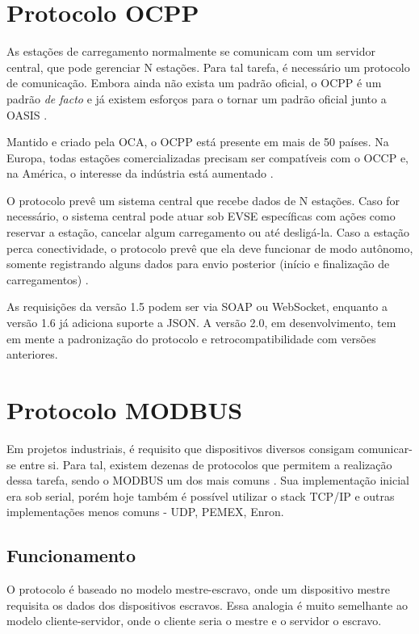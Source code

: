  \section{Protocolo OCPP}

    As estações de carregamento normalmente se comunicam com um servidor central, que pode gerenciar N estações. Para tal tarefa, é necessário um protocolo de comunicação. Embora ainda não exista um padrão oficial, o \ac{OCPP} é um padrão \textit{de facto} e já existem esforços para o tornar um padrão oficial junto a \ac{OASIS} \cite{ocpp-news-standardization}.

    Mantido e criado pela \ac{OCA}, o OCPP está presente em mais de 50 países. Na Europa, todas estações comercializadas precisam ser compatíveis com o OCCP e, na América, o interesse da indústria está aumentado \cite{ocpp-news-forbes}.

    O protocolo prevê um sistema central que recebe dados de N estações. Caso for necessário, o sistema central pode atuar sob \ac{EVSE} específicas com ações como reservar a estação, cancelar algum carregamento ou até desligá-la. Caso a estação perca conectividade, o protocolo prevê que ela deve funcionar de modo autônomo, somente registrando alguns dados para envio posterior (início e finalização de carregamentos) \cite{ocpp-spec-15}.

    As requisições da versão 1.5 podem ser via SOAP ou WebSocket, enquanto a versão 1.6 já adiciona suporte a JSON. A versão 2.0, em desenvolvimento, tem em mente a padronização do protocolo e retrocompatibilidade com versões anteriores.

  \section{Protocolo MODBUS}

    Em projetos industriais, é requisito que dispositivos diversos consigam comunicar-se entre si. Para tal, existem dezenas de protocolos que permitem a realização dessa tarefa, sendo o MODBUS um dos mais comuns \cite{modbus-spec-application}. Sua implementação inicial era sob serial, porém hoje também é possível utilizar o stack TCP/IP e outras implementações menos comuns - UDP, PEMEX, Enron.

    \subsection{Funcionamento}

      O protocolo é baseado no modelo mestre-escravo, onde um dispositivo mestre requisita os dados dos dispositivos escravos. Essa analogia é muito semelhante ao modelo cliente-servidor, onde o cliente seria o mestre e o servidor o escravo.


